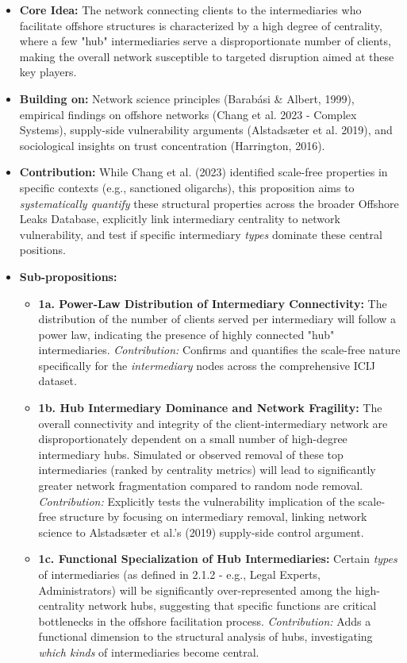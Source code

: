 \begin{itemize}[leftmargin=*]
    \item \textbf{Core Idea:} The network connecting clients to the intermediaries who facilitate offshore structures is characterized by a high degree of centrality, where a few "hub" intermediaries serve a disproportionate number of clients, making the overall network susceptible to targeted disruption aimed at these key players.
    \item \textbf{Building on:} Network science principles (Barabási \& Albert, 1999), empirical findings on offshore networks (Chang et al. 2023 - Complex Systems), supply-side vulnerability arguments (Alstadsæter et al. 2019), and sociological insights on trust concentration (Harrington, 2016).
    \item \textbf{Contribution:} While Chang et al. (2023) identified scale-free properties in specific contexts (e.g., sanctioned oligarchs), this proposition aims to \textit{systematically quantify} these structural properties across the broader Offshore Leaks Database, explicitly link intermediary centrality to network vulnerability, and test if specific intermediary \textit{types} dominate these central positions.
    \item \textbf{Sub-propositions:}
    \begin{itemize}[leftmargin=\parindent]
        \item \textbf{1a. Power-Law Distribution of Intermediary Connectivity:} The distribution of the number of clients served per intermediary will follow a power law, indicating the presence of highly connected "hub" intermediaries. \textit{Contribution:} Confirms and quantifies the scale-free nature specifically for the \textit{intermediary} nodes across the comprehensive ICIJ dataset.
        \item \textbf{1b. Hub Intermediary Dominance and Network Fragility:} The overall connectivity and integrity of the client-intermediary network are disproportionately dependent on a small number of high-degree intermediary hubs. Simulated or observed removal of these top intermediaries (ranked by centrality metrics) will lead to significantly greater network fragmentation compared to random node removal. \textit{Contribution:} Explicitly tests the vulnerability implication of the scale-free structure by focusing on intermediary removal, linking network science to Alstadsæter et al.'s (2019) supply-side control argument.
        \item \textbf{1c. Functional Specialization of Hub Intermediaries:} Certain \textit{types} of intermediaries (as defined in 2.1.2 - e.g., Legal Experts, Administrators) will be significantly over-represented among the high-centrality network hubs, suggesting that specific functions are critical bottlenecks in the offshore facilitation process. \textit{Contribution:} Adds a functional dimension to the structural analysis of hubs, investigating \textit{which kinds} of intermediaries become central.
    \end{itemize}
\end{itemize}

